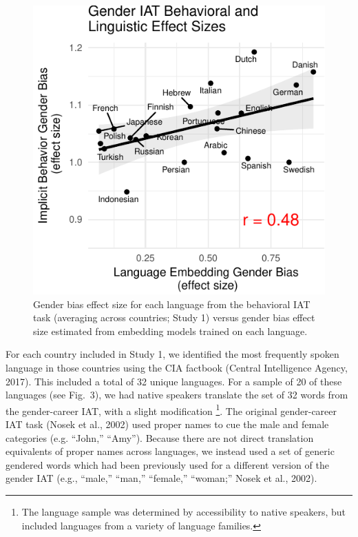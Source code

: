 \documentclass[10pt, letterpaper]{article}
\newenvironment{CodeChunk}{}{}
\begin{document}
\begin{CodeChunk}
\begin{figure}[t]

{\centering \includegraphics{figs/behavior_vs_language_plot-1} 

}

\caption[Gender bias effect size for each language from the behavioral IAT task (averaging across countries]{Gender bias effect size for each language from the behavioral IAT task (averaging across countries; Study 1) versus gender bias effect size estimated from embedding models trained on each language.}\label{fig:behavior_vs_language_plot}
\end{figure}
\end{CodeChunk}

For each country included in Study 1, we identified the most frequently
spoken language in those countries using the CIA factbook (Central
Intelligence Agency, 2017). This included a total of 32 unique
languages. For a sample of 20 of these languages (see Fig.~3), we had
native speakers translate the set of 32 words from the gender-career
IAT, with a slight modification
\footnote{The language sample was determined by accessibility to native speakers, but included languages from a variety of language families.}.
The original gender-career IAT task (Nosek et al., 2002) used proper
names to cue the male and female categories (e.g. ``John,'' ``Amy'').
Because there are not direct translation equivalents of proper names
across languages, we instead used a set of generic gendered words which
had been previously used for a different version of the gender IAT
(e.g., ``male,'' ``man,'' ``female,'' ``woman;'' Nosek et al., 2002).
\end{document}
